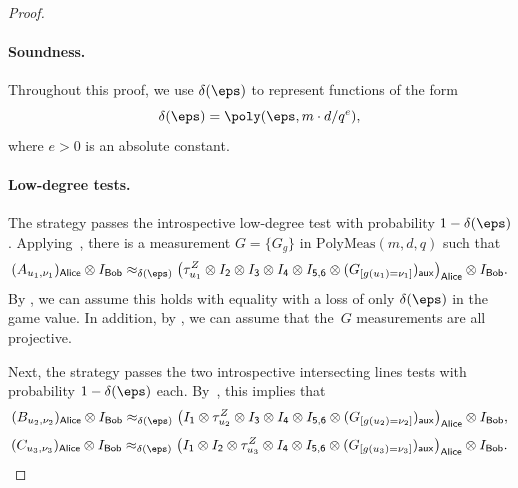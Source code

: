 \documentclass[11pt]{article}
\newcommand{\reg}[1]{{\mathsf{#1}}}
\begin{document}
\begin{proof}
\paragraph{Soundness.}
Throughout this proof, we use $\delta(\eps)$ to represent functions of the form
\begin{equation*}
\delta(\eps) = \poly(\eps, m \cdot d/q^e),
\end{equation*}
where $e > 0$ is an absolute constant.

\paragraph{Low-degree tests.}
The strategy passes the introspective low-degree test with probability $1-\delta(\eps)$.
Applying~, there is a measurement $G = \{G_g\}$ in $\mathrm{PolyMeas}(m, d, q)$ such that
\begin{equation*}
(A_{u_1, \nu_1})_{\reg{Alice}} \otimes I_{\reg{Bob}}
\approx_{\delta(\eps)}
\left(\tau^Z_{u_1} \otimes I_{\reg{2}} \otimes I_{\reg{3}} \otimes I_{\reg{4}} \otimes I_{\reg{5,6}} \otimes (G_{[g(u_1) = \nu_1]})_{\reg{aux}}\right)_{\reg{Alice}} \otimes I_{\reg{Bob}}.
\end{equation*}
By , we can assume this holds with equality
with a loss of only $\delta(\eps)$ in the game value.
In addition, by , we can assume that the~$G$ measurements are all projective.

Next, the strategy passes the two introspective intersecting lines tests with probability $1-\delta(\eps)$ each.
By~, this implies that
\begin{equation}\label{eq:whatevs}
(B_{u_2, \nu_2})_{\reg{Alice}} \otimes I_{\reg{Bob}}
\approx_{\delta(\eps)}
\left(I_{\reg{1}} \otimes \tau^Z_{u_2} \otimes I_{\reg{3}} \otimes I_{\reg{4}} \otimes I_{\reg{5,6}} \otimes (G_{[g(u_2) = \nu_2]})_{\reg{aux}}\right)_{\reg{Alice}} \otimes I_{\reg{Bob}},
\end{equation}
\begin{equation}\label{eq:whatevs-dos}
(C_{u_3, \nu_3})_{\reg{Alice}} \otimes I_{\reg{Bob}}
\approx_{\delta(\eps)}
\left(I_{\reg{1}} \otimes I_{\reg{2}} \otimes \tau^Z_{u_3} \otimes I_{\reg{4}} \otimes I_{\reg{5,6}} \otimes (G_{[g(u_3) = \nu_3]})_{\reg{aux}}\right)_{\reg{Alice}} \otimes I_{\reg{Bob}}.
\end{equation}


\end{proof}
\end{document}
